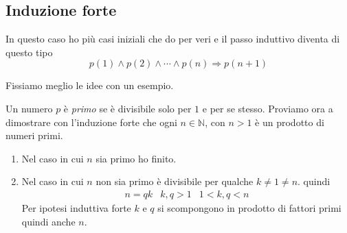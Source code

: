 \subsection{Induzione forte}
In questo caso ho pi\`u casi iniziali che do per veri e il passo induttivo diventa di questo
tipo
\begin{equation*}
	p(1) \wedge p(2) \wedge \cdots \wedge p(n) \Rightarrow p(n + 1)
\end{equation*}

Fissiamo meglio le idee con un esempio.

\begin{example}
	Un numero $p$ \`e \emph{primo} se \`e divisibile solo per $1$ e per se stesso.
	Proviamo ora a dimostrare con l'induzione forte che ogni $n \in \mathbb{N}$, con $n > 1$
	\`e un prodotto di numeri primi.
	\begin{enumerate}
		\item Nel caso in cui $n$ sia primo ho finito.
		\item Nel caso in cui $n$ non sia primo \`e divisibile per qualche $k \neq 1 \neq n$.
		      quindi
		      \begin{equation*}
			      \begin{array}{lcr}
				      n = qk & k, q > 1 & 1 < k, q < n
			      \end{array}
		      \end{equation*}
		      Per ipotesi induttiva forte $k$ e $q$ si scompongono in prodotto di fattori primi
		      quindi anche $n$.
	\end{enumerate}
\end{example}

